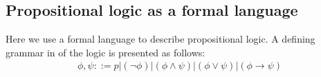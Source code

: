 \subsection{Propositional logic as a formal language}

Here we use a formal language to describe propositional logic.
A defining grammar in  of the logic is presented as follows:
\begin{align*}
  \phi, \psi ::= p | (\neg \phi) | (\phi \wedge \psi) | (\phi \vee \psi) | (\phi \to \psi)
\end{align*}